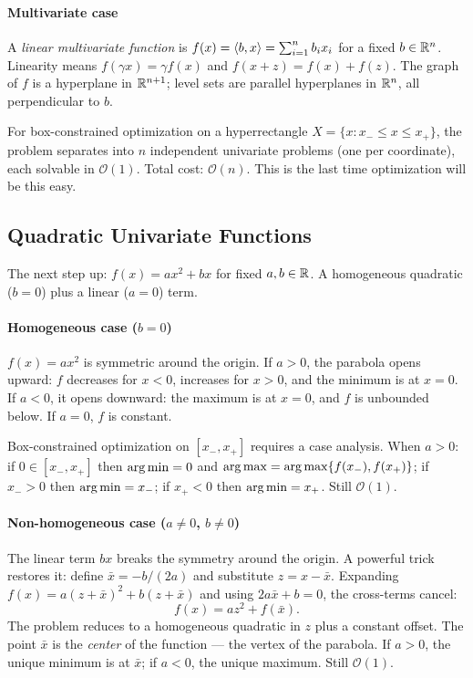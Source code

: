 \paragraph{Multivariate case}

A \textit{linear multivariate function} is $f(x) = \langle b, x\rangle = \sum_{i=1}^{n} b_i x_i$ for a fixed $b \in \mathbb{R}^n$.
Linearity means $f(\gamma x) = \gamma f(x)$ and $f(x + z) = f(x) + f(z)$.
The graph of $f$ is a hyperplane in $\mathbb{R}^{n+1}$; level sets are parallel hyperplanes in $\mathbb{R}^n$, all perpendicular to $b$.

For box-constrained optimization on a hyperrectangle $X = \{x : x_- \leq x \leq x_+\}$, the problem separates into $n$ independent univariate problems (one per coordinate), each solvable in $\mathcal{O}(1)$.
Total cost: $\mathcal{O}(n)$.
This is the last time optimization will be this easy.


\subsection{Quadratic Univariate Functions}\label{ssec:quad-univariate}

The next step up: $f(x) = ax^2 + bx$ for fixed $a, b \in \mathbb{R}$.
A homogeneous quadratic ($b = 0$) plus a linear ($a = 0$) term.

\paragraph{Homogeneous case ($b = 0$)}

$f(x) = ax^2$ is symmetric around the origin.
If $a > 0$, the parabola opens upward: $f$ decreases for $x < 0$, increases for $x > 0$, and the minimum is at $x = 0$.
If $a < 0$, it opens downward: the maximum is at $x = 0$, and $f$ is unbounded below.
If $a = 0$, $f$ is constant.

Box-constrained optimization on $[x_-, x_+]$ requires a case analysis.
When $a > 0$: if $0 \in [x_-, x_+]$ then $\operatorname*{arg\,min} = 0$ and $\operatorname*{arg\,max} = \operatorname*{arg\,max}\{f(x_-), f(x_+)\}$; if $x_- > 0$ then $\operatorname*{arg\,min} = x_-$; if $x_+ < 0$ then $\operatorname*{arg\,min} = x_+$.
Still $\mathcal{O}(1)$.

\paragraph{Non-homogeneous case ($a \neq 0$, $b \neq 0$)}

The linear term $bx$ breaks the symmetry around the origin.
A powerful trick restores it: define $\bar{x} = -b / (2a)$ and substitute $z = x - \bar{x}$.
Expanding $f(x) = a(z + \bar{x})^2 + b(z + \bar{x})$ and using $2a\bar{x} + b = 0$, the cross-terms cancel:
\begin{equation}\label{eq:completing-square-univariate}
	f(x) = az^2 + f(\bar{x}).
\end{equation}
The problem reduces to a homogeneous quadratic in $z$ plus a constant offset.
The point $\bar{x}$ is the \textit{center} of the function --- the vertex of the parabola.
If $a > 0$, the unique minimum is at $\bar{x}$; if $a < 0$, the unique maximum.
Still $\mathcal{O}(1)$.

